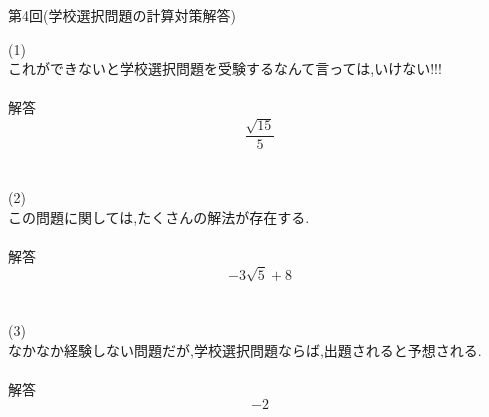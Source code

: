 \documentclass{jarticle}
\begin{document}
\begin{center}
第4回(学校選択問題の計算対策解答)
\end{center}
(1)
\\
これができないと学校選択問題を受験するなんて言っては,いけない!!!
\\
\\
解答
\\
\[\frac{\sqrt{15}}{5}\]
\\
\\
(2)
\\
この問題に関しては,たくさんの解法が存在する.
\\
\\
解答
\\
\[-3\sqrt{5}+8\]
\\
\\
(3)
\\
なかなか経験しない問題だが,学校選択問題ならば,出題されると予想される.
\\
\\
解答
\\
\[-2\]
\end{document}
